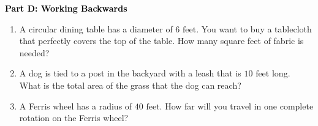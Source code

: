 \documentclass[12pt, letterpaper, fleqn]{article}
\begin{document}
\begin{tcolorbox}[colback=customteal!20]
\large\textcolor{black}{\textbf{Part D: Working Backwards}}
\end{tcolorbox}

\vspace{3mm}

\begin{enumerate}[itemsep=2.5cm, leftmargin=0.6cm, resume]
\item A circular dining table has a diameter of $6\text{ feet}$. You want to buy a tablecloth that perfectly covers the top of the table. How many square feet of fabric is needed?
\item A dog is tied to a post in the backyard with a leash that is $10\text{ feet}$ long. What is the total area of the grass that the dog can reach?
\item A Ferris wheel has a radius of $40\text{ feet}$. How far will you travel in one complete rotation on the Ferris wheel?
\end{enumerate}
\end{document}
